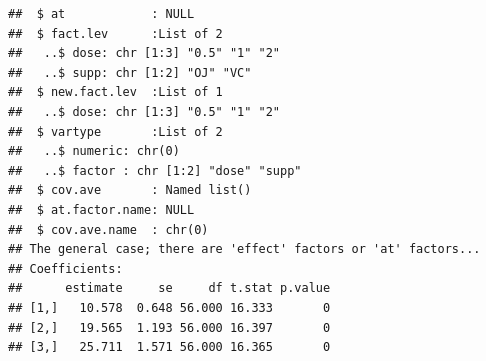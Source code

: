\documentclass[10pt]{article}\usepackage[]{graphicx}\usepackage[]{color}
\makeatletter
\newenvironment{kframe}{%
 \def\at@end@of@kframe{}%
 \ifinner\ifhmode%
  \def\at@end@of@kframe{\end{minipage}}%
  \begin{minipage}{\columnwidth}%
 \fi\fi%
 \def\FrameCommand##1{\hskip\@totalleftmargin \hskip-\fboxsep
 \colorbox{shadecolor}{##1}\hskip-\fboxsep
     \hskip-\linewidth \hskip-\@totalleftmargin \hskip\columnwidth}%
 \MakeFramed {\advance\hsize-\width
   \@totalleftmargin\z@ \linewidth\hsize
   \@setminipage}}%
 {\par\unskip\endMakeFramed%
 \at@end@of@kframe}
\newenvironment{knitrout}{}{} %
\makeatother
\begin{document}
\begin{knitrout}
\begin{kframe}
\begin{verbatim}
##  $ at            : NULL
##  $ fact.lev      :List of 2
##   ..$ dose: chr [1:3] "0.5" "1" "2"
##   ..$ supp: chr [1:2] "OJ" "VC"
##  $ new.fact.lev  :List of 1
##   ..$ dose: chr [1:3] "0.5" "1" "2"
##  $ vartype       :List of 2
##   ..$ numeric: chr(0) 
##   ..$ factor : chr [1:2] "dose" "supp"
##  $ cov.ave       : Named list()
##  $ at.factor.name: NULL
##  $ cov.ave.name  : chr(0) 
## The general case; there are 'effect' factors or 'at' factors...
## Coefficients:
##      estimate     se     df t.stat p.value
## [1,]   10.578  0.648 56.000 16.333       0
## [2,]   19.565  1.193 56.000 16.397       0
## [3,]   25.711  1.571 56.000 16.365       0
\end{verbatim}
\end{kframe}
\end{knitrout}


















\end{document}
